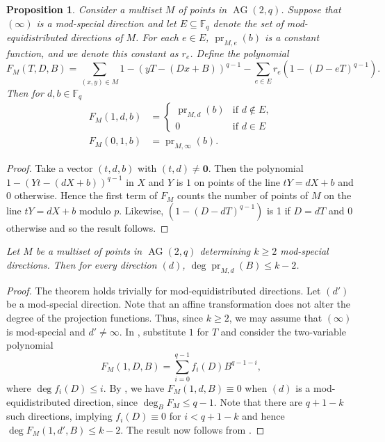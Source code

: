 \documentclass[12pt, a4paper]{article}
\newtheorem{prop}[thm]{Proposition}
\theoremstyle{definition}
\newcommand{\FF}{\mathbb F}
\newcommand{\zero}{\mathbf 0}
\DeclareMathOperator{\pr}{pr}
\DeclareMathOperator{\AG}{AG}
\newcommand{\ag}{\AG}
\begin{document}
\begin{prop}
 \label{Prop:AddRedPol}
 Consider a multiset $M$ of points in $\ag(2,q)$.
 Suppose that $(\infty)$ is a mod-special direction and let $E \subseteq \FF_q$ denote the set of mod-equidistributed directions of $M$.
 For each $e \in E$, $\pr_{M,e}(b)$ is a constant function, and we denote this constant as $r_e$.
 Define the polynomial
 \[
 F_M(T,D,B) = \sum_{(x,y) \in M} 1 - (yT - (Dx + B))^{q-1} - \sum_{e \in E} r_e (1-(D-eT)^{q-1}).
\]
Then for $d, b \in \FF_q$
\begin{align*}
 F_M(1,d,b) &= \begin{cases}
  \pr_{M,d}(b) & \text{if } d \notin E, \\
  0 & \text{if } d \in E
 \end{cases} \\
 F_M(0,1,b) &= \pr_{M,\infty}(b).
\end{align*}
\end{prop}

\begin{proof}
 Take a vector $(t,d,b)$ with $(t,d) \neq \zero$.
 Then the polynomial $1 - (Yt - (dX + b))^{q-1}$ in $X$ and $Y$ is $1$ on points of the line $tY = dX+b$ and 0 otherwise. Hence the first term of $F_M$ counts the number of points of $M$ on the line $tY = dX +b$ modulo $p$.  Likewise, $(1-(D-dT)^{q-1})$ is 1 if $D = dT$ and 0 otherwise and so the result follows. 
\end{proof}

 {\it 
 Let $M$ be a multiset of points in $\ag(2,q)$ determining $k \geq 2$ mod-special directions.
 Then for every direction $(d)$, $\deg \pr_{M,d}(B) \leq k-2$.
}

\begin{proof}
The theorem holds trivially for mod-equidistributed directions. Let $(d')$ be a mod-special direction. Note that an affine transformation does not alter the degree of the projection functions. Thus, since $k \geq 2$, we may assume that $(\infty)$ is mod-special and $d' \neq \infty$. In , substitute $1$ for $T$ and consider the two-variable polynomial
\[
F_M(1, D, B) = \sum_{i=0}^{q-1} f_i(D) B^{q-1-i},
\]
where $\deg f_i(D) \leq i$. By , we have $F_M(1, d, B) \equiv 0$ when $(d)$ is a mod-equidistributed direction, since $\deg_B F_M \leq q-1$. Note that there are $q+1-k$ such directions, implying $f_i(D) \equiv 0$ for $i < q+1-k$ and hence $\deg F_M(1, d', B) \leq k - 2$. The result now follows from .
\end{proof}
\end{document}
